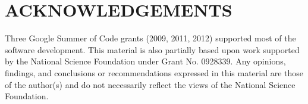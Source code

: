 \documentclass[twocolumn,10pt]{asme2e}
\begin{document}
\section*{ACKNOWLEDGEMENTS}
Three Google Summer of Code grants (2009, 2011, 2012) supported most of the
software development. This material is also partially based upon work supported
by the National Science Foundation under Grant No. 0928339. Any opinions,
findings, and conclusions or recommendations expressed in this material are
those of the author(s) and do not necessarily reflect the views of the National
Science Foundation.


\end{document}
